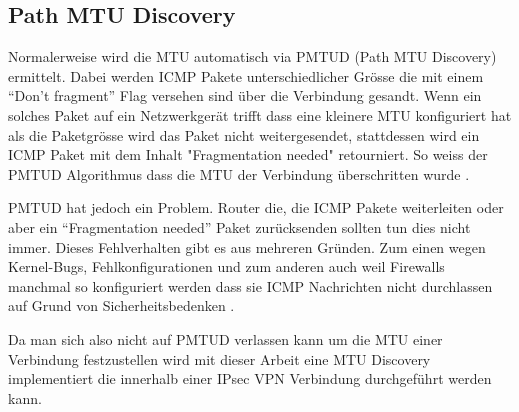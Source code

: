 \subsection{Path MTU Discovery}
Normalerweise wird die \ac{MTU} automatisch via \ac{PMTUD} (Path MTU Discovery) ermittelt. Dabei werden \ac{ICMP} Pakete unterschiedlicher Grösse die mit einem \enquote{Don't fragment} Flag versehen sind über die Verbindung gesandt. Wenn ein solches Paket auf ein Netzwerkgerät trifft dass eine kleinere \ac{MTU} konfiguriert hat als die Paketgrösse wird das Paket nicht weitergesendet, stattdessen wird ein \ac{ICMP} Paket mit dem Inhalt "Fragmentation needed" retourniert. So weiss der \ac{PMTUD} Algorithmus dass die \ac{MTU} der Verbindung überschritten wurde \cite[:131]{rfc1191}.

\ac{PMTUD} hat jedoch ein Problem. Router die, die \ac{ICMP} Pakete weiterleiten oder aber ein \enquote{Fragmentation needed} Paket zurücksenden sollten tun dies nicht immer. Dieses Fehlverhalten gibt es aus mehreren Gründen. Zum einen wegen Kernel-Bugs, Fehlkonfigurationen und zum anderen auch weil Firewalls manchmal so konfiguriert werden dass sie \ac{ICMP} Nachrichten nicht durchlassen auf Grund von Sicherheitsbedenken \cite[:137]{rfc2923}.

Da man sich also nicht auf \ac{PMTUD} verlassen kann um die \ac{MTU} einer Verbindung festzustellen wird mit dieser Arbeit eine \ac{MTU} Discovery implementiert die innerhalb einer \ac{IPsec} \ac{VPN} Verbindung durchgeführt werden kann.
